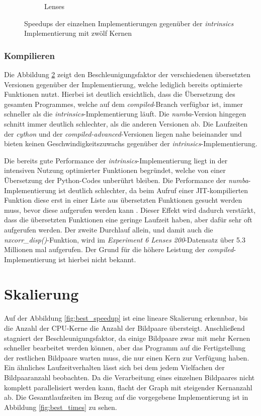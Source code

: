 \begin{center}
\begin{figure}[htbp]
\begin{subfigure}[b]{0.54\textwidth}
			\caption{Lenses}
			\label{fig:speedups_lenses}
		\end{subfigure}
		\caption{Speedups der einzelnen Implementierungen gegenüber der \textit{intrinsics} Implementierung mit zwölf Kernen}
		\label{fig:speedups}
	\end{figure}
\end{center}

\subsubsection{Kompilieren}

Die Abbildung \ref{fig:speedups} zeigt den Beschleunigungsfaktor der verschiedenen übersetzten Versionen gegenüber der Implementierung, welche lediglich bereits optimierte Funktionen nutzt. Hierbei ist deutlich ersichtlich, dass die Übersetzung des gesamten Programmes, welche auf dem \textit{compiled}-Branch verfügbar ist, immer schneller als die \textit{intrinsics}-Implementierung läuft. Die \textit{numba}-Version hingegen schnitt immer deutlich schlechter, als die anderen Versionen ab. Die Laufzeiten der \textit{cython} und der \textit{compiled-advanced}-Versionen liegen nahe beieinander und bieten keinen Geschwindigkeitszuwachs gegenüber der \textit{intrinsics}-Implementierung. 

Die bereits gute Performance der \textit{intrinsics}-Implementierung liegt in der intensiven Nutzung optimierter Funktionen begründet, welche von einer Übersetzung der Python-Codes unberührt bleiben. Die Performance der \textit{numba}-Implementierung ist deutlich schlechter, da beim Aufruf einer \gls{JIT}-kompilierten Funktion diese erst in einer Liste aus übersetzten Funktionen gesucht werden muss, bevor diese aufgerufen werden kann \cite{PKA17}. Dieser Effekt wird dadurch verstärkt, dass die übersetzten Funktionen eine geringe Laufzeit haben, aber dafür sehr oft aufgerufen werden. Der zweite Durchlauf allein, und damit auch die \textit{nxcorr\_disp()}-Funktion, wird im \textit{Experiment 6 Lenses 200}-Datensatz über 5.3 Millionen mal aufgerufen. Der Grund für die höhere Leistung der \textit{compiled}-Implementierung ist hierbei nicht bekannt. 

\section{Skalierung}

Auf der Abbildung \ref{fig:best_speedup} ist eine lineare Skalierung erkennbar, bis die Anzahl der \gls{CPU}-Kerne die Anzahl der Bildpaare übersteigt. Anschließend stagniert der Beschleunigungsfaktor, da einige Bildpaare zwar mit mehr Kernen schneller bearbeitet werden können, aber das Programm auf die Fertigstellung der restlichen Bildpaare warten muss, die nur einen Kern zur Verfügung haben. Ein ähnliches Laufzeitverhalten lässt sich bei dem jedem Vielfachen der Bildpaaranzahl beobachten. Da die Verarbeitung eines einzelnen Bildpaares nicht komplett parallelisiert werden kann, flacht der Graph mit steigender Kernanzahl ab. Die Gesamtlaufzeiten im Bezug auf die vorgegebene Implementierung ist in Abbildung \ref{fig:best_times} zu sehen. 

